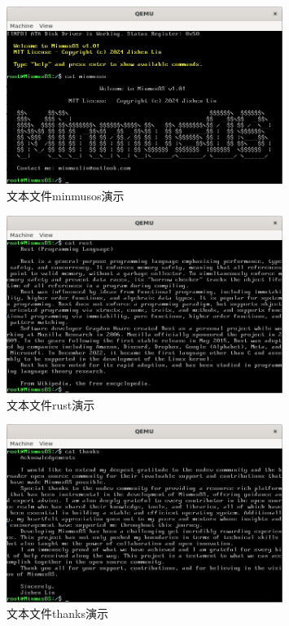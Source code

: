 \begin{figure}[htbp]
    \centering
    \includegraphics[width=0.8\textwidth]{figures/MinmusOSFilePresentation.png}
    \caption{文本文件minmusos演示}
    \label{fig:MinmusOSFilePresentation}
\end{figure}

\begin{figure}[htbp]
    \centering
    \includegraphics[width=0.8\textwidth]{figures/RustFilePresentation.png}
    \caption{文本文件rust演示}
    \label{fig:RustFilePresentation}
\end{figure}

\begin{figure}[htbp]
    \centering
    \includegraphics[width=0.8\textwidth]{figures/ThanksFilePresentation.png}
    \caption{文本文件thanks演示}
    \label{fig:ThanksFilePresentation}
\end{figure}

